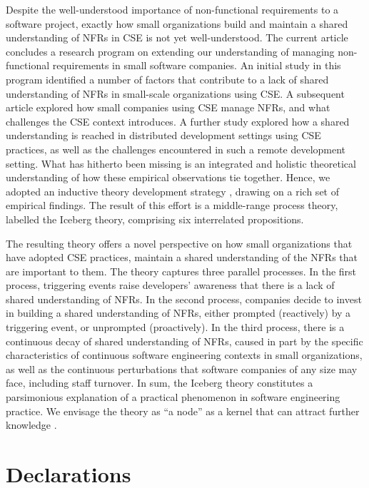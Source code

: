 \documentclass[smallextended]{svjour3}       %
\begin{document}
Despite the well-understood importance of non-functional requirements to a software project, exactly how small organizations build and maintain a shared understanding of NFRs in CSE is not yet well-understood.
The current article concludes a research program on extending our understanding of managing non-functional requirements in small software companies. An initial study in this program \citep{werner2020re} identified a number of factors that contribute to a lack of shared understanding of NFRs in small-scale organizations using CSE.
A subsequent article \citep{werner_tse_2021} explored how small companies using CSE manage NFRs, and what challenges the CSE context introduces. A further study \citep{okpara_re2022,okpara_rej2023} explored how a shared understanding is reached in distributed development settings using CSE practices, as well as the challenges encountered in such a remote development setting. 
What has hitherto been missing is an integrated and holistic theoretical understanding of how these empirical observations tie together. Hence, we adopted an inductive theory development strategy \citep{stol2018abc}, drawing on a rich set of empirical findings. The result of this effort is a middle-range process theory, labelled the Iceberg theory, comprising six interrelated propositions. 

The resulting theory offers a novel perspective on how small organizations that have adopted CSE practices, maintain a shared understanding of the NFRs that are important to them. The theory captures three parallel processes.
In the first process, triggering events raise developers' awareness that there is a lack of shared understanding of NFRs. In the second process, companies decide to invest in building a shared understanding of NFRs, either prompted (reactively) by a triggering event, or unprompted (proactively). In the third process, there is a continuous decay of shared understanding of NFRs, caused in part by the specific characteristics of continuous software engineering contexts in small organizations, as well as the continuous perturbations that software companies of any size may face, including staff turnover. 
In sum, the Iceberg theory constitutes a parsimonious explanation of a practical phenomenon in software engineering practice. We envisage the theory as ``a node'' as a kernel that can attract further knowledge \cite[p. xi]{miner2015organizational}.

\footnotesize 

\section*{Declarations}
\end{document}
